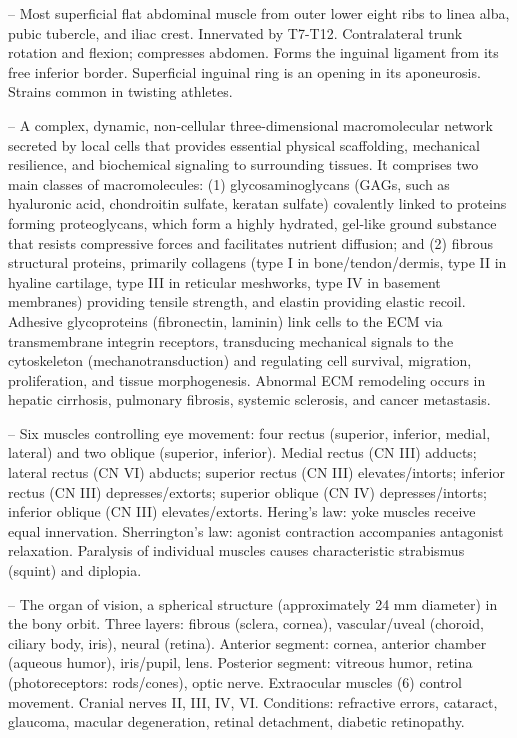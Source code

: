 -- Most superficial flat abdominal muscle from outer lower eight ribs to linea alba, pubic tubercle, and iliac crest. Innervated by T7-T12. Contralateral trunk rotation and flexion; compresses abdomen. Forms the inguinal ligament from its free inferior border. Superficial inguinal ring is an opening in its aponeurosis. Strains common in twisting athletes.

-- A complex, dynamic, non-cellular three-dimensional macromolecular network secreted by local cells that provides essential physical scaffolding, mechanical resilience, and biochemical signaling to surrounding tissues. It comprises two main classes of macromolecules: (1) glycosaminoglycans (GAGs, such as hyaluronic acid, chondroitin sulfate, keratan sulfate) covalently linked to proteins forming proteoglycans, which form a highly hydrated, gel-like ground substance that resists compressive forces and facilitates nutrient diffusion; and (2) fibrous structural proteins, primarily collagens (type I in bone/tendon/dermis, type II in hyaline cartilage, type III in reticular meshworks, type IV in basement membranes) providing tensile strength, and elastin providing elastic recoil. Adhesive glycoproteins (fibronectin, laminin) link cells to the ECM via transmembrane integrin receptors, transducing mechanical signals to the cytoskeleton (mechanotransduction) and regulating cell survival, migration, proliferation, and tissue morphogenesis. Abnormal ECM remodeling occurs in hepatic cirrhosis, pulmonary fibrosis, systemic sclerosis, and cancer metastasis.

-- Six muscles controlling eye movement: four rectus (superior, inferior, medial, lateral) and two oblique (superior, inferior). Medial rectus (CN III) adducts; lateral rectus (CN VI) abducts; superior rectus (CN III) elevates/intorts; inferior rectus (CN III) depresses/extorts; superior oblique (CN IV) depresses/intorts; inferior oblique (CN III) elevates/extorts. Hering's law: yoke muscles receive equal innervation. Sherrington's law: agonist contraction accompanies antagonist relaxation. Paralysis of individual muscles causes characteristic strabismus (squint) and diplopia.

-- The organ of vision, a spherical structure (approximately 24 mm diameter) in the bony orbit. Three layers: fibrous (sclera, cornea), vascular/uveal (choroid, ciliary body, iris), neural (retina). Anterior segment: cornea, anterior chamber (aqueous humor), iris/pupil, lens. Posterior segment: vitreous humor, retina (photoreceptors: rods/cones), optic nerve. Extraocular muscles (6) control movement. Cranial nerves II, III, IV, VI. Conditions: refractive errors, cataract, glaucoma, macular degeneration, retinal detachment, diabetic retinopathy.

